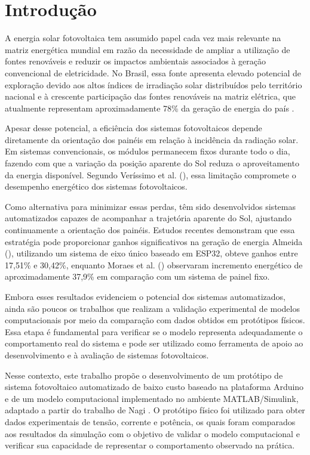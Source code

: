 \chapter{Introdução} 
\label{cap1_introducao}

A energia solar fotovoltaica tem assumido papel cada vez mais relevante na matriz energética mundial em razão da necessidade de ampliar a utilização de fontes renováveis e reduzir os impactos ambientais associados à geração convencional de eletricidade. No Brasil, essa fonte apresenta elevado potencial de exploração devido aos altos índices de irradiação solar distribuídos pelo território nacional e à crescente participação das fontes renováveis na matriz elétrica, que atualmente representam aproximadamente 78\% da geração de energia do país \cite{tavares2023}.

Apesar desse potencial, a eficiência dos sistemas fotovoltaicos depende diretamente da orientação dos painéis em relação à incidência da radiação solar. Em sistemas convencionais, os módulos permanecem fixos durante todo o dia, fazendo com que a variação da posição aparente do Sol reduza o aproveitamento da energia disponível. Segundo Veríssimo et al. (\citeyear{verissimo2017}), essa limitação compromete o desempenho energético dos sistemas fotovoltaicos.

Como alternativa para minimizar essas perdas, têm sido desenvolvidos sistemas automatizados capazes de acompanhar a trajetória aparente do Sol, ajustando continuamente a orientação dos painéis. Estudos recentes demonstram que essa estratégia pode proporcionar ganhos significativos na geração de energia Almeida (\citeyear{almeida2024}), utilizando um sistema de eixo único baseado em ESP32, obteve ganhos entre 17,51\% e 30,42\%, enquanto Moraes et al. (\citeyear{moraes2024}) observaram incremento energético de aproximadamente 37,9\% em comparação com um sistema de painel fixo.

Embora esses resultados evidenciem o potencial dos sistemas automatizados, ainda são poucos os trabalhos que realizam a validação experimental de modelos computacionais por meio da comparação com dados obtidos em protótipos físicos. Essa etapa é fundamental para verificar se o modelo representa adequadamente o comportamento real do sistema e pode ser utilizado como ferramenta de apoio ao desenvolvimento e à avaliação de sistemas fotovoltaicos.

Nesse contexto, este trabalho propõe o desenvolvimento de um protótipo de sistema fotovoltaico automatizado de baixo custo baseado na plataforma Arduino e de um modelo computacional implementado no ambiente MATLAB/Simulink, adaptado a partir do trabalho de Nagi \cite{nagi2023}. O protótipo físico foi utilizado para obter dados experimentais de tensão, corrente e potência, os quais foram comparados aos resultados da simulação com o objetivo de validar o modelo computacional e verificar sua capacidade de representar o comportamento observado na prática.


